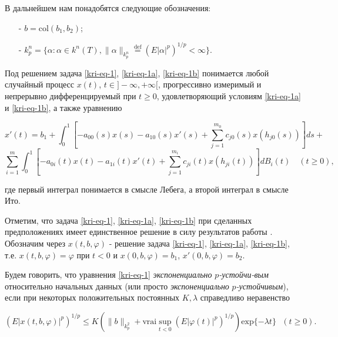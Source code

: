 В дальнейшем нам понадобятся следующие обозначения:

\begin{itemize}
	\item[-]
	$b=\text{col}(b_1,b_2)$;
	
	\item[-]
	$k_p^n=\{\alpha :\alpha \in k^n(T),\|\alpha \|_{k_p^n}\overset{\text{def}}{=}\left(E|\alpha
	|^p\right)^{1/p}<\infty \}$.
\end{itemize}

Под решением задача \eqref{kri-eq-1}, \eqref{kri-eq-1a}, \eqref{kri-eq-1b} понимается любой случайный процесс $x(t)$, $t\in ]-\infty ,+\infty[$, прогрессивно измеримый и непрерывно дифференцируемый при  $t\ge 0$, удовлетворяющий условиям \eqref{kri-eq-1a} и \eqref{kri-eq-1b}, а также уравнению

\begin{equation}\label{kri-eq-1-1}
	x'(t) = b_1+ \int_{0}^{1} \left[-a_{00}(s)x(s) - a_{10}(s)x'(s) + \sum_{j=1}^{m_0}c_{j0}(s)x(h_{j0}(s))\right]ds +
\end{equation}
\begin{equation*}
	\sum_{i=1}^{m} \int_{0}^{1} \left[-a_{0i}(t)x(t)-a_{1i}(t)x'(t)+\sum_{j=1}^{m_i}c_{ji}(t)x(h_{ji}(t))\right]dB_i(t) \quad (t \ge 0),
\end{equation*}

где первый интеграл понимается в смысле Лебега, а второй интеграл в смысле Ито.

Отметим, что задача \eqref{kri-eq-1}, \eqref{kri-eq-1a}, \eqref{kri-eq-1b} при сделанных предположениях имеет единственное решение в силу результатов работы \cite{kri-bib-10}. Обозначим через $x(t,b,\varphi )$ - решение задача \eqref{kri-eq-1}, \eqref{kri-eq-1a}, \eqref{kri-eq-1b}, т.е. $x(t,b,\varphi)=\varphi$ при $t<0$ и $x(0,b,\varphi)=b_1$, $x'(0,b,\varphi)=b_2$.

\begin{definition}
Будем говорить, что уравнения \eqref{kri-eq-1} \textit{экспоненциально } $p$\textit{{}-устойчи-\linebreak вым}
относительно начальных данных (или просто \textit{экспоненциально } $p$\textit{{}-устойчивым}), если при некоторых
положительных постоянных  $K, \lambda$ справедливо неравенство

\begin{equation*}
(E|x(t,b,\varphi )|^p)^{1/p}\le K\left(\|b\|_{k_p^2}+ \mathrm{vrai} \sup\limits_{t<0}(E|\varphi
(t)|^p)^{1/p}\right)\mathrm{exp}\{-\mathit{\lambda t}\}\text{  }(t\geq 0).
\end{equation*}
\end{definition}

